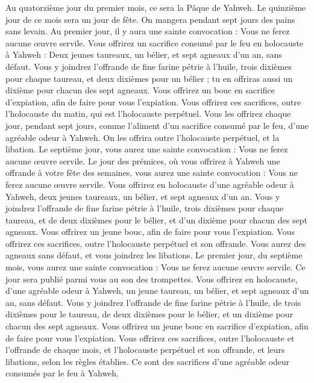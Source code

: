 \begin{multicols}{2}
Au quatorzième jour du premier mois, ce sera la Pâque de Yahweh.
Le quinzième jour de ce mois sera un jour de fête. On mangera pendant sept jours des pains sans levain.
Au premier jour, il y aura une sainte convocation : Vous ne ferez aucune œuvre servile.
Vous offrirez un sacrifice consumé par le feu en holocauste à Yahweh : Deux jeunes taureaux, un bélier, et sept agneaux d'un an, sans défaut.
Vous y joindrez l’offrande de fine farine pétrie à l'huile, trois dixièmes pour chaque taureau, et deux dixièmes pour un bélier ;
tu en offriras aussi un dixième pour chacun des sept agneaux.
Vous offrirez un bouc en sacrifice d’expiation, afin de faire pour vous l’expiation.
Vous offrirez ces sacrifices, outre l'holocauste du matin, qui est l'holocauste perpétuel.
Vous les offrirez chaque jour, pendant sept jours, comme l’aliment d’un sacrifice consumé par le feu, d’une agréable odeur à Yahweh. On les offrira outre l'holocauste perpétuel, et la libation.
Le septième jour, vous aurez une sainte convocation : Vous ne ferez aucune œuvre servile.
Le jour des prémices, où vous offrirez à Yahweh une offrande à votre fête des semaines, vous aurez une sainte convocation : Vous ne ferez aucune œuvre servile.
Vous offrirez en holocauste d’une agréable odeur à Yahweh, deux jeunes taureaux, un bélier, et sept agneaux d'un an.
Vous y joindrez l’offrande de fine farine pétrie à l'huile, trois dixièmes pour chaque taureau, et de deux dixièmes pour le bélier,
et d'un dixième pour chacun des sept agneaux.
Vous offrirez un jeune bouc, afin de faire pour vous l’expiation.
Vous offrirez ces sacrifices, outre l'holocauste perpétuel et son offrande. Vous aurez des agneaux sans défaut, et vous joindrez les libations.
\VerseOne{}Le premier jour, du septième mois, vous aurez une sainte convocation : Vous ne ferez aucune œuvre servile. Ce jour sera publié parmi vous au son des trompettes.
Vous offrirez en holocauste, d’une agréable odeur à Yahweh, un jeune taureau, un bélier, et sept agneaux d'un an, sans défaut.
Vous y joindrez l’offrande de fine farine pétrie à l'huile, de trois dixièmes pour le taureau, de deux dixièmes pour le bélier,
et un dixième pour chacun des sept agneaux.
Vous offrirez un jeune bouc en sacrifice d’expiation, afin de faire pour vous l’expiation.
Vous offrirez ces sacrifices, outre l'holocauste et l’offrande de chaque mois, et l'holocauste perpétuel et son offrande, et leurs libations, selon les règles établies. Ce sont des sacrifices d’une agréable odeur consumés par le feu à Yahweh.

\end{multicols}
